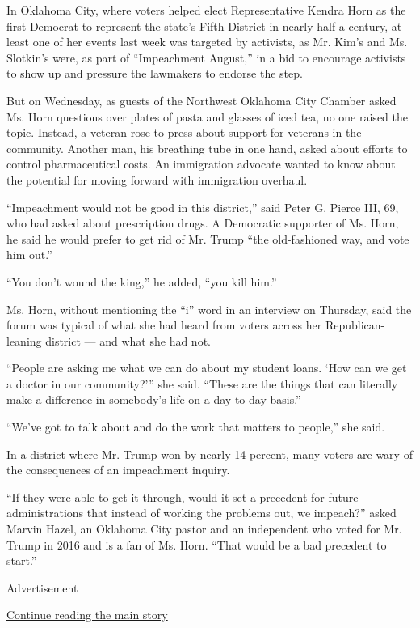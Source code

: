 In Oklahoma City, where voters helped elect Representative Kendra Horn
as the first Democrat to represent the state's Fifth District in nearly
half a century, at least one of her events last week was targeted by
activists, as Mr. Kim's and Ms. Slotkin's were, as part of ``Impeachment
August,'' in a bid to encourage activists to show up and pressure the
lawmakers to endorse the step.

But on Wednesday, as guests of the Northwest Oklahoma City Chamber asked
Ms. Horn questions over plates of pasta and glasses of iced tea, no one
raised the topic. Instead, a veteran rose to press about support for
veterans in the community. Another man, his breathing tube in one hand,
asked about efforts to control pharmaceutical costs. An immigration
advocate wanted to know about the potential for moving forward with
immigration overhaul.

``Impeachment would not be good in this district,'' said Peter G. Pierce
III, 69, who had asked about prescription drugs. A Democratic supporter
of Ms. Horn, he said he would prefer to get rid of Mr. Trump ``the
old-fashioned way, and vote him out.''

``You don't wound the king,'' he added, ``you kill him.''

Ms. Horn, without mentioning the ``i'' word in an interview on Thursday,
said the forum was typical of what she had heard from voters across her
Republican-leaning district --- and what she had not.

``People are asking me what we can do about my student loans. `How can
we get a doctor in our community?''' she said. ``These are the things
that can literally make a difference in somebody's life on a day-to-day
basis.''

``We've got to talk about and do the work that matters to people,'' she
said.

In a district where Mr. Trump won by nearly 14 percent, many voters are
wary of the consequences of an impeachment inquiry.

``If they were able to get it through, would it set a precedent for
future administrations that instead of working the problems out, we
impeach?'' asked Marvin Hazel, an Oklahoma City pastor and an
independent who voted for Mr. Trump in 2016 and is a fan of Ms. Horn.
``That would be a bad precedent to start.''

Advertisement

\protect\hyperlink{after-bottom}{Continue reading the main story}

